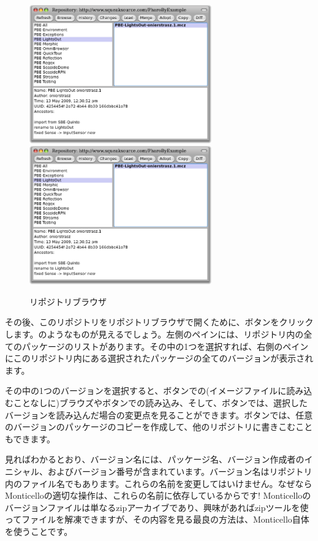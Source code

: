 \documentclass[a4paper,10pt,twoside]{book}
\begin{document}
\begin{figure}[btp]
\begin{center}
\ifluluelse
{\includegraphics[width=0.7\textwidth]{SqueakSource-PBE}}
{\includegraphics[width=0.7\textwidth]{SqueakSource-PBE}}
\end{center}
\caption{リポジトリブラウザ}
\end{figure}
\noindent
その後、このリポジトリをリポジトリブラウザで開くために、ボタンをクリックします。のようなものが見えるでしょう。左側のペインには、リポジトリ内の全てのパッケージのリストがあります。その中の1つを選択すれば、右側のペインにこのリポジトリ内にある選択されたパッケージの全てのバージョンが表示されます。

その中の1つのバージョンを選択すると、ボタンでの(イメージファイルに読み込むことなしに)ブラウズやボタンでの読み込み、そして、ボタンでは、選択したバージョンを読み込んだ場合の変更点を見ることができます。ボタンでは、任意のバージョンのパッケージのコピーを作成して、他のリポジトリに書きこむこともできます。

見ればわかるとおり、バージョン名には、パッケージ名、バージョン作成者のイニシャル、およびバージョン番号が含まれています。バージョン名はリポジトリ内のファイル名でもあります。これらの名前を変更してはいけません。なぜならMonticelloの適切な操作は、これらの名前に依存しているからです! Monticelloのバージョンファイルは単なるzipアーカイブであり、興味があればzipツールを使ってファイルを解凍できますが、その内容を見る最良の方法は、Monticello自体を使うことです。
\end{document}
